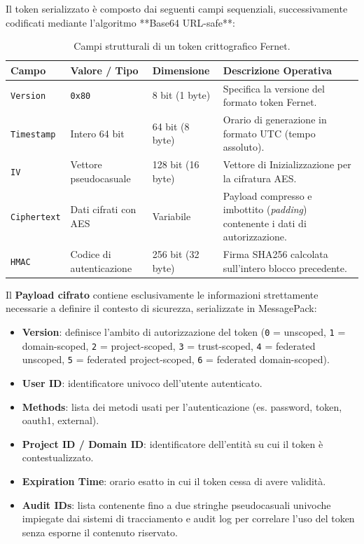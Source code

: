 \documentclass[11pt, a4paper]{article}
\begin{document}
Il token serializzato è composto dai seguenti campi sequenziali, successivamente codificati mediante l'algoritmo **Base64 URL-safe**:

\begin{table}[H]
\centering
\small
\begin{tabularx}{\textwidth}{l l l X}
\toprule
\textbf{Campo} & \textbf{Valore / Tipo} & \textbf{Dimensione} & \textbf{Descrizione Operativa} \\
\midrule
\texttt{Version} & \texttt{0x80} & 8 bit (1 byte) & Specifica la versione del formato token Fernet. \\
\texttt{Timestamp} & Intero 64 bit & 64 bit (8 byte) & Orario di generazione in formato UTC (tempo assoluto). \\
\texttt{IV} & Vettore pseudocasuale & 128 bit (16 byte) & Vettore di Inizializzazione per la cifratura AES. \\
\texttt{Ciphertext} & Dati cifrati con AES & Variabile & Payload compresso e imbottito (\emph{padding}) contenente i dati di autorizzazione. \\
\texttt{HMAC} & Codice di autenticazione & 256 bit (32 byte) & Firma SHA256 calcolata sull'intero blocco precedente. \\
\bottomrule
\end{tabularx}
\caption{Campi strutturali di un token crittografico Fernet.}
\end{table}


Il \textbf{Payload cifrato} contiene esclusivamente le informazioni strettamente necessarie a definire il contesto di sicurezza, serializzate in MessagePack:
\begin{itemize}[noitemsep]
    \item \textbf{Version}: definisce l'ambito di autorizzazione del token (\texttt{0} = unscoped, \texttt{1} = domain-scoped, \texttt{2} = project-scoped, \texttt{3} = trust-scoped, \texttt{4} = federated unscoped, \texttt{5} = federated project-scoped, \texttt{6} = federated domain-scoped).
    \item \textbf{User ID}: identificatore univoco dell'utente autenticato.
    \item \textbf{Methods}: lista dei metodi usati per l'autenticazione (es. password, token, oauth1, external).
    \item \textbf{Project ID / Domain ID}: identificatore dell'entità su cui il token è contestualizzato.
    \item \textbf{Expiration Time}: orario esatto in cui il token cessa di avere validità.
    \item \textbf{Audit IDs}: lista contenente fino a due stringhe pseudocasuali univoche impiegate dai sistemi di tracciamento e audit log per correlare l'uso del token senza esporne il contenuto riservato.
\end{itemize}
\end{document}
